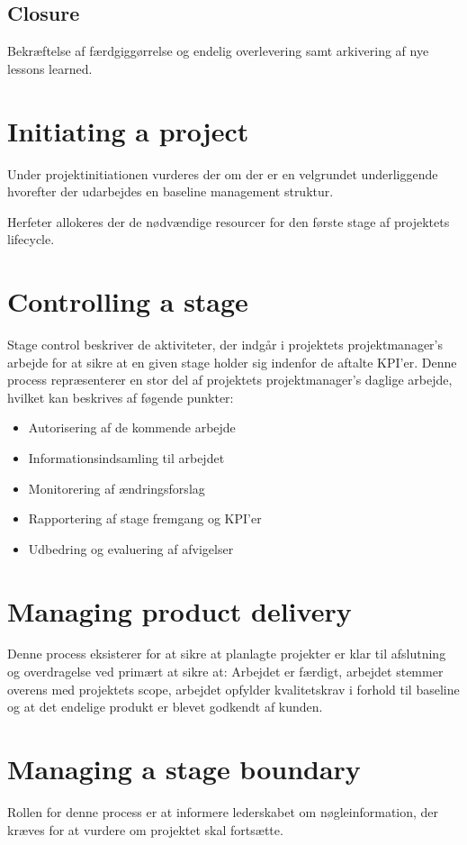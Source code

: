 \subsection*{Closure}
Bekræftelse af færdgiggørrelse og endelig overlevering samt arkivering af nye lessons learned.

\section{Initiating a project}
Under projektinitiationen vurderes der om der er en velgrundet underliggende  hvorefter der udarbejdes en baseline management struktur. 

Herfeter allokeres der de nødvændige resourcer for den første stage af projektets lifecycle.

\section{Controlling a stage}
Stage control beskriver de aktiviteter, der indgår i projektets projektmanager's arbejde for at sikre at en given stage holder sig indenfor de aftalte KPI'er. Denne process repræsenterer en stor del af projektets projektmanager's daglige arbejde, hvilket kan beskrives af føgende punkter:

\begin{itemize}
    \item Autorisering af de kommende arbejde
    \item Informationsindsamling til arbejdet
    \item Monitorering af ændringsforslag
    \item Rapportering af stage fremgang og KPI'er
    \item Udbedring og evaluering af afvigelser
\end{itemize}

\section{Managing product delivery}
Denne process eksisterer for at sikre at planlagte projekter er klar til afslutning og overdragelse ved primært at sikre at: Arbejdet er færdigt, arbejdet stemmer overens med projektets scope, arbejdet opfylder kvalitetskrav i forhold til baseline og at det endelige produkt er blevet godkendt af kunden.

\section{Managing a stage boundary}
Rollen for denne process er at informere lederskabet om nøgleinformation, der kræves for at vurdere om projektet skal fortsætte.

